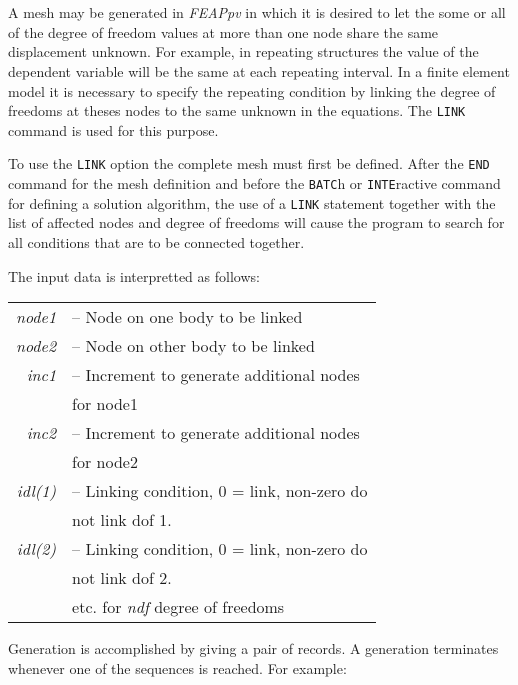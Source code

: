 \\{\smallskip}
\\{\smallskip}
\headb

A mesh may be generated in {\sl FEAPpv} in which it is desired
to let the some or all of the degree of freedom values at
more than one node share the same displacement unknown.
For example, in repeating structures the value of the dependent
variable will be the same at each repeating interval.
In a finite element model it is necessary to specify the
repeating condition by linking the degree of freedoms at
theses nodes to the same unknown in the equations.  The
{\tt LINK} command is used for this purpose.

To use the {\tt LINK} option the complete mesh must first
be defined.  After the {\tt END} command for the mesh definition
and before the {\tt BATC}h or {\tt INTE}ractive command
for defining a solution algorithm, the use of a {\tt LINK}
statement together with the list of affected nodes and
degree of freedoms will cause the program to search for all
conditions that are to be connected together.

The input data is interpretted as follows:

\begin{center}
\begin{tabular}{r l}
\it  node1   &-- Node on one body to be linked           \\
\it  node2   &-- Node on other body to be linked           \\
\it  inc1    &-- Increment to generate additional nodes     \\
             &\quad for node1           \\
\it  inc2    &-- Increment to generate additional nodes     \\
             &\quad for node2           \\
\it  idl(1)  &-- Linking condition, 0 = link, non-zero do   \\
             &\quad not link dof 1.           \\
\it  idl(2)  &-- Linking condition, 0 = link, non-zero do   \\
             &\quad not link dof 2.           \\
             &\quad etc. for {\it ndf} degree of freedoms      \\
\end{tabular}
\end{center}
Generation is accomplished by giving a pair of  records.   A
generation  terminates  whenever  one  of  the  sequences is
reached.  For example:

